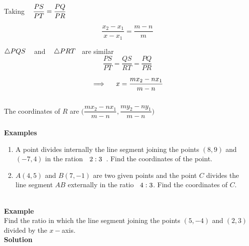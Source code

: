 \documentclass[11pt,a4paper]{article}
\begin{document}
Taking $\hspace{0.3cm}\dfrac{PS}{PT} = \dfrac{PQ}{PR}$

$$\frac{x_2 - x_1}{x - x_1} = \frac{m - n}{m}$$


$\triangle PQS\hspace{0.3cm}$ and $\hspace{0.3cm} \triangle PRT\hspace{0.2cm}$ are similar 
$$\dfrac{PS}{PT}= \dfrac{QS}{RT} = \dfrac{PQ}{PR}$$

$$\implies\hspace{0.4cm} x = \dfrac{mx_2 - nx_1}{m-n}$$\\



The coordinates of $R$ are \hspace{0.2cm}$\Bigg(\dfrac{mx_2 - nx_1}{m - n}, \dfrac{my_2 - ny_1}{m - n}\Bigg)$\\\\














\pagebreak
\textbf{Examples}
\begin{enumerate}
\item A point divides internally the line segment joining the points $(8,9)$ and $(-7,4)$ in the ration $\hspace{0.2cm} 2:3\hspace{0.2cm}$. Find the coordinates  of the point.

\item $A(4,5)$ and $B(7,-1)$ are two given points and the point $C$ divides the line segment $AB$ externally in the ratio $\hspace{0.2cm} 4: 3$. Find the coordinates of $C$.\\\\
\end{enumerate}










\textbf{Example}\\
Find the ratio in which the line segment joining the points $(5,-4)$ and $(2,3)$ divided by the $x-$axis.\\

\textbf{Solution}\\
\end{document}
